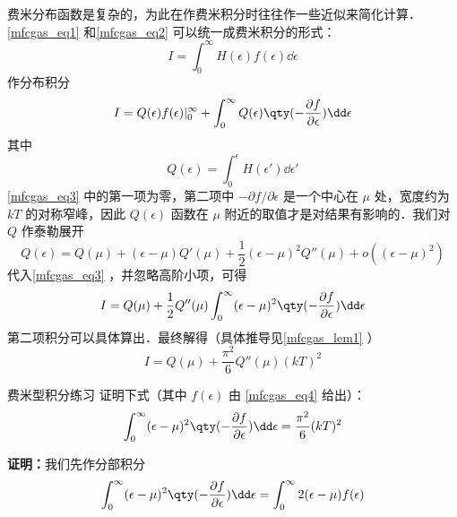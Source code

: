 费米分布函数是复杂的，为此在作费米积分时往往作一些近似来简化计算．\autoref{mfcgas_eq1} 和\autoref{mfcgas_eq2} 可以统一成费米积分的形式：
\begin{equation}
I=\int_0^\infty H(\epsilon)f(\epsilon)\dd\epsilon
\end{equation}
作分布积分
\begin{equation}\label{mfcgas_eq3}
I=Q(\epsilon)f(\epsilon)|_0^\infty + \int_0^\infty Q(\epsilon)\qty(-\frac{\partial f}{\partial\epsilon})\dd \epsilon
\end{equation}
其中
\begin{equation}
Q(\epsilon)=\int_0^\epsilon H(\epsilon')\dd\epsilon'
\end{equation}
\autoref{mfcgas_eq3} 中的第一项为零，第二项中 $-\partial f/\partial \epsilon$ 是一个中心在 $\mu$ 处，宽度约为 $kT$ 的对称窄峰，因此 $Q(\epsilon)$ 函数在 $\mu$ 附近的取值才是对结果有影响的．我们对 $Q$ 作泰勒展开
\begin{equation}
Q(\epsilon)=Q(\mu)+(\epsilon-\mu)Q'(\mu)+\frac{1}{2}(\epsilon-\mu)^2 Q''(\mu)+o((\epsilon-\mu)^2)
\end{equation}
代入\autoref{mfcgas_eq3} ，并忽略高阶小项，可得
\begin{equation}
I=Q(\mu)+\frac{1}{2}Q''(\mu)\int_0^\infty (\epsilon-\mu)^2 \qty(-\frac{\partial f}{\partial \epsilon})\dd\epsilon
\end{equation}
第二项积分可以具体算出．最终解得（具体推导见\autoref{mfcgas_lem1} ）
\begin{equation}
I=Q(\mu)+\frac{\pi^2}{6}Q''(\mu)(k T)^2
\end{equation}
\begin{lemma}{费米型积分练习}\label{mfcgas_lem1}
证明下式（其中 $f(\epsilon)$ 由 \autoref{mfcgas_eq4} 给出）：
\begin{equation}
\int_0^\infty (\epsilon-\mu)^2 \qty(-\frac{\partial f}{\partial \epsilon})\dd\epsilon
=\frac{\pi^2}{6}(kT)^2
\end{equation}

\textbf{证明：}我们先作分部积分
\begin{equation}
\int_0^\infty (\epsilon-\mu)^2 \qty(-\frac{\partial f}{\partial \epsilon})\dd\epsilon
=\int_0^\infty 2(\epsilon-\mu) f(\epsilon)
\end{equation}
\end{lemma}